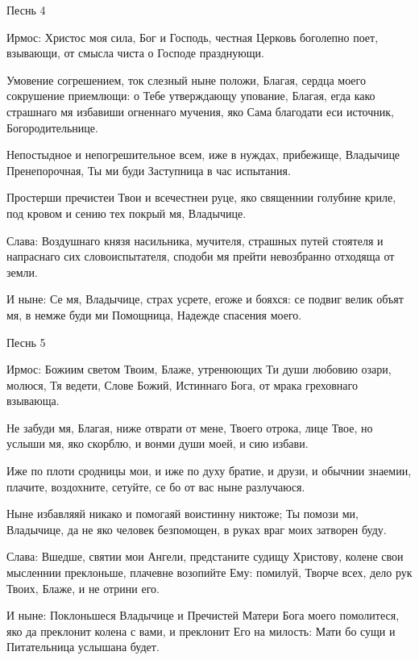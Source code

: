 \bfseries \itshape 


Песнь 4\normalfont{}\normalfont{}


Ирмос: Христос моя сила, Бог и Господь, честная Церковь боголепно поет, взывающи, от смысла чиста о Господе празднующи.





Умовение согрешением, ток слезный ныне положи, Благая, сердца моего сокрушение приемлющи: о Тебе утверждающу упование, Благая, егда како страшнаго мя избавиши огненнаго мучения, яко Сама благодати еси источник, Богородительнице.


Непостыдное и непогрешительное всем, иже в нуждах, прибежище, Владычице Пренепорочная, Ты ми буди Заступница в час испытания.


Простерши пречистеи Твои и всечестнеи руце, яко священнии голубине криле, под кровом и сению тех покрый мя, Владычице.


Слава: Воздушнаго князя насильника, мучителя, страшных путей стоятеля и напраснаго сих словоиспытателя, сподоби мя прейти невозбранно отходяща от земли.


И ныне: Се мя, Владычице, страх усрете, егоже и бояхся: се подвиг велик объят мя, в немже буди ми Помощница, Надежде спасения моего.


\bfseries \itshape 


Песнь 5\normalfont{}\normalfont{}


Ирмос: Божиим светом Твоим, Блаже, утренюющих Ти души любовию озари, молюся, Тя ведети, Слове Божий, Истиннаго Бога, от мрака греховнаго взывающа.





Не забуди мя, Благая, ниже отврати от мене, Твоего отрока, лице Твое, но услыши мя, яко скорблю, и вонми души моей, и сию избави.


Иже по плоти сродницы мои, и иже по духу братие, и друзи, и обычнии знаемии, плачите, воздохните, сетуйте, се бо от вас ныне разлучаюся.


Ныне избавляяй никако и помогаяй воистинну никтоже; Ты помози ми, Владычице, да не яко человек безпомощен, в руках враг моих затворен буду.


Слава: Вшедше, святии мои Ангели, предстаните судищу Христову, колене свои мысленнии преклоньше, плачевне возопийте Ему: помилуй, Творче всех, дело рук Твоих, Блаже, и не отрини его.


И ныне: Поклоньшеся Владычице и Пречистей Матери Бога моего помолитеся, яко да преклонит колена с вами, и преклонит Его на милость: Мати бо сущи и Питательница услышана будет.


